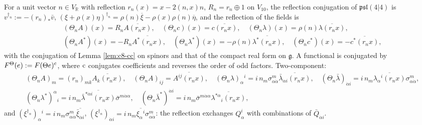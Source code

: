 \begin{definition}[Reflections]
\label{def:c8-Theta}
For a unit vector $n\in V_{\mathbb R}$ with reflection $r_n(x)=x-2(n,x)n$, $R_n=r_n\oplus1$ on $V_{10}$, the reflection conjugation of $\mathfrak{psl}(4|4)$ is $v^{\dagger_n}:=-(r_n)_*\bar v$, $(\xi+\rho(x)\eta)^{\dagger_n}=\rho(n)\overline\xi-\rho(x)\rho(n)\overline\eta$, and the reflection of the fields is
\[
\begin{aligned}
&(\Theta_nA)(x)=R_n\overline{A(r_nx)},\quad (\Theta_nc)(x)=\overline{c(r_nx)},\quad (\Theta_n\lambda)(x)=\rho(n)\overline{\lambda(r_nx)},\\
&(\Theta_nA^*)(x)=-R_n\overline{A^*(r_nx)},\quad (\Theta_n\lambda^*)(x)=-\rho(n)\overline{\lambda^*(r_nx)},\quad (\Theta_nc^*)(x)=-\overline{c^*(r_nx)},
\end{aligned}
\]
with the conjugation of Lemma \ref{lem:c8-cc} on spinors and that of the compact real form on $\mathfrak g$. A functional is conjugated by $F^{\Theta}(e):=F(\Theta e)^{\rm c}$, where ${\rm c}$ conjugates coefficients and reverses the order of odd factors. Two-component:
\[
\begin{aligned}
&(\Theta_nA)_m=(r_n)_{mk}\overline{A_k(r_nx)},\quad (\Theta_nA)_{ij}=\overline{A^{ij}(r_nx)},\quad (\Theta_n\lambda)_\alpha{}^i=i\,n_m\sigma^m_{\alpha\dot\alpha}\overline{\bar\lambda_{\dot\alpha i}(r_nx)},\quad (\Theta_n\bar\lambda)_{\dot\alpha i}=i\,n_m\overline{\lambda_\alpha{}^i(r_nx)}\sigma^m_{\alpha\dot\alpha},\\
&(\Theta_n\lambda^*)^\alpha{}_i=i\,n_m\overline{\bar\lambda^{*\dot\alpha i}(r_nx)}\bar\sigma^{m\dot\alpha\alpha},\quad (\Theta_n\bar\lambda^*)^{\dot\alpha i}=i\,n_m\bar\sigma^{m\dot\alpha\alpha}\overline{\lambda^{*\alpha}{}_i(r_nx)},
\end{aligned}
\]
and $(\xi^{\dagger_n})_\alpha{}^i=i\,n_m\sigma^m_{\alpha\dot\alpha}\overline{\bar\xi_{\dot\alpha i}}$, $(\xi^{\dagger_n})_{\dot\alpha i}=i\,n_m\overline{\xi_\alpha{}^i}\sigma^m_{\alpha\dot\alpha}$: the reflection exchanges $Q^i_\alpha$ with combinations of $\bar Q_{\dot\alpha i}$.
\end{definition}

